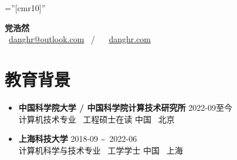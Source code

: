 \documentclass[a4paper,10pt]{ctexart} %
\begin{document}
\pagestyle{empty} %

\font\fb=''[cmr10]'' %

\newenvironment{keepsection}{\par\noindent\minipage{\textwidth}}{\endminipage\par}

\newcommand{\datetlide}{\textasciitilde \ }



\begin{keepsection}
\begin{center}
    \textbf{\LARGE 党浩然} \\
     \  \href{mailto:danghr@outlook.com}{danghr@outlook.com} \  / \   \  \href{https://www.danghr.com}{danghr.com} \\
\end{center}
\end{keepsection}


\begin{keepsection}

\section{教育背景}

\begin{itemize}
    \item \textbf{中国科学院大学 / 中国科学院计算技术研究所} \hfill 2022-09至今 \\
    计算机技术专业 \, 工程硕士在读  \hfill 中国 \, 北京
    \item \textbf{上海科技大学} \hfill 2018-09 \datetlide 2022-06 \\
    计算机科学与技术专业 \, 工学学士  \hfill 中国 \, 上海
\end{itemize}

\end{keepsection}
\end{document}
